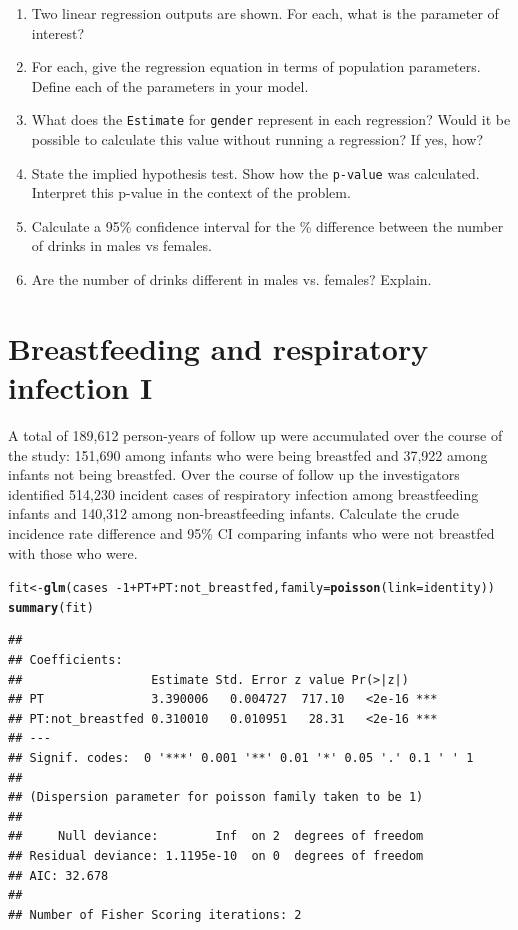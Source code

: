 \documentclass[landscape,twocolumn,letterpaper,9pt,reqno]{article}\usepackage[]{graphicx}\usepackage[]{color}
\newcommand{\hlnum}[1]{\textcolor[rgb]{0.686,0.059,0.569}{#1}}%
\newcommand{\hlopt}[1]{\textcolor[rgb]{0,0,0}{#1}}%
\newcommand{\hlstd}[1]{\textcolor[rgb]{0.345,0.345,0.345}{#1}}%
\newcommand{\hlkwb}[1]{\textcolor[rgb]{0.69,0.353,0.396}{#1}}%
\newcommand{\hlkwc}[1]{\textcolor[rgb]{0.333,0.667,0.333}{#1}}%
\newcommand{\hlkwd}[1]{\textcolor[rgb]{0.737,0.353,0.396}{\textbf{#1}}}%
\newenvironment{knitrout}{}{} %
\newcommand{\compresslist}{ %
	\setlength{\itemsep}{1pt}
	\setlength{\parskip}{0pt}
	\setlength{\parsep}{0pt}
}
\begin{document}
\begin{enumerate}\compresslist
	\item Two linear regression outputs are shown. For each, what is the parameter of interest?
	\item For each, give the regression equation in terms of population parameters. Define each of the parameters in your model.
	\item What does the \texttt{Estimate} for \texttt{gender} represent in each regression? Would it be possible to calculate this value without running a regression? If yes, how?
	\item State the implied hypothesis test. Show how the \texttt{p-value} was calculated. Interpret this p-value in the context of the problem. 
	\item Calculate a 95\% confidence interval for the \% difference between the number of drinks in males vs females. 
	\item Are the number of drinks different in males vs. females? Explain. 
\end{enumerate}


\clearpage

\section{Breastfeeding and respiratory infection I}

A total of 189,612 person-years of follow up were accumulated over the course of the study: 151,690
among infants who were being breastfed and 37,922 among infants not being breastfed. Over the
course of follow up the investigators identified 514,230 incident cases of respiratory infection among
breastfeeding infants and 140,312 among non-breastfeeding infants. Calculate the crude incidence rate difference and 95\% CI comparing infants who were not breastfed with those who were.

\begin{knitrout}\small
{}\color{fgcolor}
\begin{alltt}
\hlstd{fit} \hlkwb{<-} \hlkwd{glm}\hlstd{(cases} \hlopt{~ -}\hlnum{1} \hlopt{+} \hlstd{PT} \hlopt{+} \hlstd{PT}\hlopt{:}\hlstd{not_breastfed,} \hlkwc{family} \hlstd{=} \hlkwd{poisson}\hlstd{(}\hlkwc{link} \hlstd{= identity))}
\hlkwd{summary}\hlstd{(fit)}
\end{alltt}
\begin{verbatim}
## 
## Coefficients:
##                  Estimate Std. Error z value Pr(>|z|)    
## PT               3.390006   0.004727  717.10   <2e-16 ***
## PT:not_breastfed 0.310010   0.010951   28.31   <2e-16 ***
## ---
## Signif. codes:  0 '***' 0.001 '**' 0.01 '*' 0.05 '.' 0.1 ' ' 1
## 
## (Dispersion parameter for poisson family taken to be 1)
## 
##     Null deviance:        Inf  on 2  degrees of freedom
## Residual deviance: 1.1195e-10  on 0  degrees of freedom
## AIC: 32.678
## 
## Number of Fisher Scoring iterations: 2
\end{verbatim}

\end{knitrout}
\end{document}
